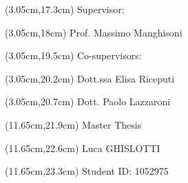 \begin{textblock*}{\textwidth}(3.05cm,17.3cm) 
    Supervisor:
\end{textblock*}
\begin{textblock*}{\textwidth}(3.05cm,18cm)
    Prof. Massimo Manghisoni
\end{textblock*}

\begin{textblock*}{\textwidth}(3.05cm,19.5cm)
    Co-supervisors:
\end{textblock*}
\begin{textblock*}{\textwidth}(3.05cm,20.2cm)
    Dott.ssa Elisa Riceputi
\end{textblock*}
\begin{textblock*}{\textwidth}(3.05cm,20.7cm) 
    Dott. Paolo Lazzaroni
\end{textblock*}

\begin{textblock*}{\textwidth}(11.65cm,21.9cm)
    Master Thesis
\end{textblock*}
\begin{textblock*}{\textwidth}(11.65cm,22.6cm)
    Luca GHISLOTTI
\end{textblock*}
\begin{textblock*}{\textwidth}(11.65cm,23.3cm) 
    Student ID: 1052975
\end{textblock*}